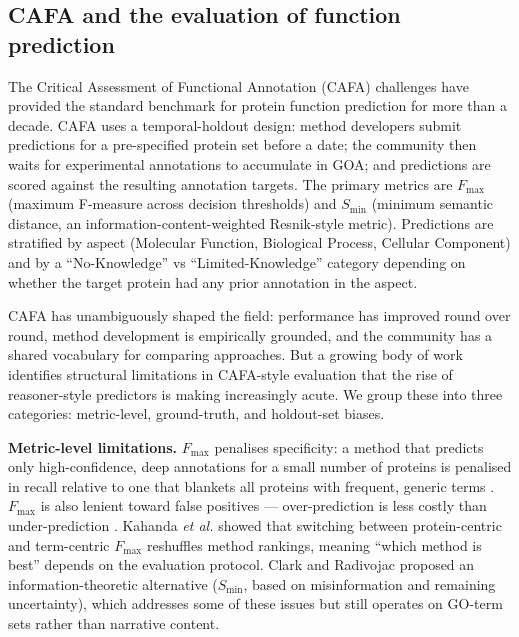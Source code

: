 \documentclass[
  11pt,
]{article}
\begin{document}
\hypertarget{cafa-and-the-evaluation-of-function-prediction}{%
\subsection{CAFA and the evaluation of function
prediction}\label{cafa-and-the-evaluation-of-function-prediction}}

The Critical Assessment of Functional Annotation (CAFA) challenges
\cite{radivojac2013,jiang2016,zhou2019} have provided the standard benchmark for protein function
prediction for more than a decade. CAFA uses a temporal-holdout design:
method developers submit predictions for a pre-specified protein set
before a date; the community then waits for experimental annotations to
accumulate in GOA; and predictions are scored against the resulting
annotation targets. The primary metrics are \(F_{\max}\) (maximum
F-measure across decision thresholds) and \(S_{\min}\) (minimum semantic
distance, an information-content-weighted Resnik-style metric).
Predictions are stratified by aspect (Molecular Function, Biological
Process, Cellular Component) and by a ``No-Knowledge'' vs
``Limited-Knowledge'' category depending on whether the target protein
had any prior annotation in the aspect.

CAFA has unambiguously shaped the field: performance has improved round
over round, method development is empirically grounded, and the
community has a shared vocabulary for comparing approaches. But a
growing body of work identifies structural limitations in CAFA-style
evaluation that the rise of reasoner-style predictors is making increasingly
acute. We group these into three categories: metric-level, ground-truth,
and holdout-set biases.

\textbf{Metric-level limitations.} \(F_{\max}\) penalises specificity: a
method that predicts only high-confidence, deep annotations for a small
number of proteins is penalised in recall relative to one that blankets
all proteins with frequent, generic terms \cite{kahanda2015}. \(F_{\max}\) is also
lenient toward false positives --- over-prediction is less costly than
under-prediction \cite{kahanda2015,clark2013}. Kahanda \emph{et al.} \cite{kahanda2015} showed that
switching between protein-centric and term-centric \(F_{\max}\)
reshuffles method rankings, meaning ``which method is best'' depends on
the evaluation protocol. Clark and Radivojac \cite{clark2013} proposed an
information-theoretic alternative (\(S_{\min}\), based on misinformation
and remaining uncertainty), which addresses some of these issues but
still operates on GO-term sets rather than narrative content.
\end{document}
